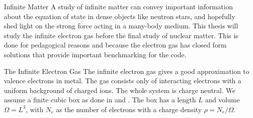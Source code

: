 \documentclass[twoside,english]{uiofysmaster}
\begin{document}
\begin{chapter}{Infinite Matter}
	A study of infinite matter can convey important information about the equation of state in dense objects like neutron stars, and hopefully shed light on the strong force acting in a many-body medium. This thesis will study the infinite electron gas before the final study of nuclear matter. This is done for pedagogical reasons and because the electron gas has closed form solutions that provide important benchmarking for the code. 
	\begin{section}{The Infinite Electron Gas}
		The infinite electron gas gives a good approximation to valence electrons in metal. The gas consists only of interacting electrons with a uniform background of charged ions. The whole system is charge neutral. We assume a finite cubic box as done in \cite{Shepherd2012} and \cite{Shepherd2013}. The box has a length $L$ and volume $\Omega = L^3$, with $N_e$ as the number of electrons with a charge density $\rho = N_e / \Omega$.


\end{section}
\end{chapter}
\end{document}
